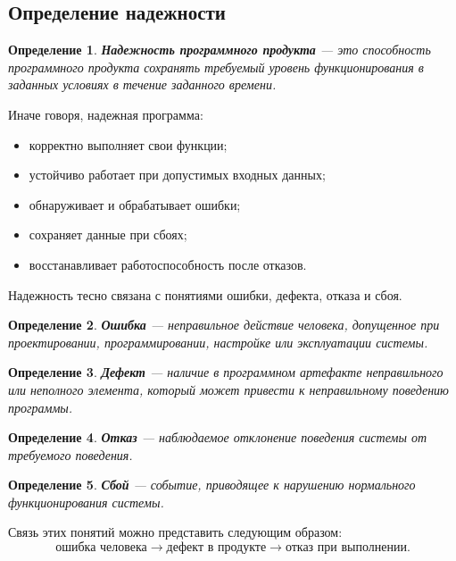 \documentclass[12pt,a4paper]{article}
\newtheorem{definition}{Определение}
\begin{document}
\subsection{Определение надежности}

\begin{definition}
\textbf{Надежность программного продукта} --- это способность программного продукта сохранять требуемый уровень функционирования в заданных условиях в течение заданного времени.
\end{definition}

Иначе говоря, надежная программа:
\begin{itemize}
    \item корректно выполняет свои функции;
    \item устойчиво работает при допустимых входных данных;
    \item обнаруживает и обрабатывает ошибки;
    \item сохраняет данные при сбоях;
    \item восстанавливает работоспособность после отказов.
\end{itemize}

Надежность тесно связана с понятиями ошибки, дефекта, отказа и сбоя.

\begin{definition}
\textbf{Ошибка} --- неправильное действие человека, допущенное при проектировании, программировании, настройке или эксплуатации системы.
\end{definition}

\begin{definition}
\textbf{Дефект} --- наличие в программном артефакте неправильного или неполного элемента, который может привести к неправильному поведению программы.
\end{definition}

\begin{definition}
\textbf{Отказ} --- наблюдаемое отклонение поведения системы от требуемого поведения.
\end{definition}

\begin{definition}
\textbf{Сбой} --- событие, приводящее к нарушению нормального функционирования системы.
\end{definition}

Связь этих понятий можно представить следующим образом:
\[
\text{ошибка человека} \rightarrow \text{дефект в продукте} \rightarrow \text{отказ при выполнении}.
\]
\end{document}
